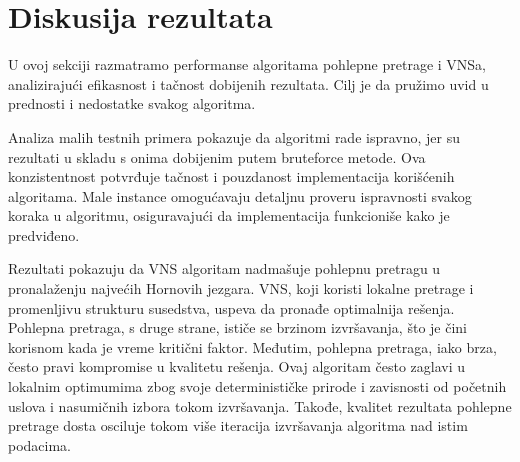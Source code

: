 \documentclass[12pt,oneside]{memoir}
\begin{document}
\begin{table}[H]
\centering

\caption{Rezultati na tri velika testna skupa}
\label{tab:test_results}
\end{table}

\newpage
\section{Diskusija rezultata}
U ovoj sekciji razmatramo performanse algoritama pohlepne pretrage i VNSa, analizirajući efikasnost i tačnost dobijenih rezultata. Cilj je da pružimo uvid u prednosti i nedostatke svakog algoritma.

Analiza malih testnih primera pokazuje da algoritmi rade ispravno, jer su rezultati u skladu s onima dobijenim putem bruteforce metode. Ova konzistentnost potvrđuje tačnost i pouzdanost implementacija korišćenih algoritama. Male instance omogućavaju detaljnu proveru ispravnosti svakog koraka u algoritmu, osiguravajući da implementacija funkcioniše kako je predviđeno.

Rezultati pokazuju da VNS algoritam nadmašuje pohlepnu pretragu u pronalaženju najvećih Hornovih jezgara. VNS, koji koristi lokalne pretrage i promenljivu strukturu susedstva, uspeva da pronađe optimalnija rešenja. Pohlepna pretraga, s druge strane, ističe se brzinom izvršavanja, što je čini korisnom kada je vreme kritični faktor. Međutim, pohlepna pretraga, iako brza, često pravi kompromise u kvalitetu rešenja. Ovaj algoritam često zaglavi u lokalnim optimumima zbog svoje determinističke prirode i zavisnosti od početnih uslova i nasumičnih izbora tokom izvršavanja. Takođe, kvalitet rezultata pohlepne pretrage dosta osciluje tokom više iteracija izvršavanja algoritma nad istim podacima.
\end{document}
